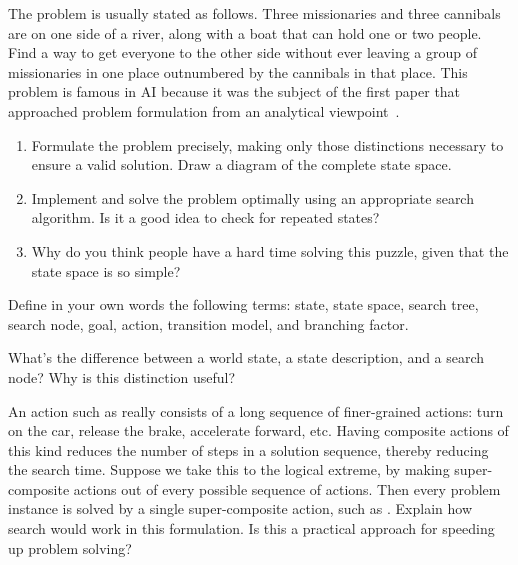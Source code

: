 \begin{exercise}[mc-problem]
\prgex
The  problem is usually stated 
as follows.  Three missionaries and three cannibals are on one side of 
a river, along with a boat that can hold one or two people.  Find a 
way to get everyone to the other side without ever leaving a group of 
missionaries in one place outnumbered by the cannibals in that place.
This problem is famous in AI because it was the subject of the first
paper that approached problem formulation from an
analytical viewpoint~\cite{Amarel:1968}. 
\begin{enumerate}
\item Formulate the problem precisely, making only those distinctions
necessary to ensure a valid solution. Draw a diagram of the complete
state space.
\item Implement and solve the problem optimally using an appropriate 
search algorithm.  Is it a good idea to check 
for repeated states? 
\item Why do you think people have a hard time solving this puzzle, given that the 
state space is so simple?
\end{enumerate}
\end{exercise} 



\begin{exercise}
Define in your own words the following terms: state, state space, search tree, 
search node, goal, action, transition model, and branching factor.
\end{exercise} 

\begin{exercise}%
What's the difference between a world state, a state description, and
a search node?  Why is this distinction useful? 
\end{exercise} 

\begin{exercise}%
An action such as  really consists of a long sequence
of finer-grained actions: turn on the car, release the brake,
accelerate forward, etc.  Having composite actions of this kind
reduces the number of steps in a solution sequence, thereby reducing
the search time.  Suppose we take this to the logical extreme, by
making super-composite actions out of every possible sequence of
 actions. Then every problem instance is solved by a single
super-composite action, such as . Explain how search would work in
this formulation. Is this a practical approach for speeding up problem
solving?
\end{exercise} 

